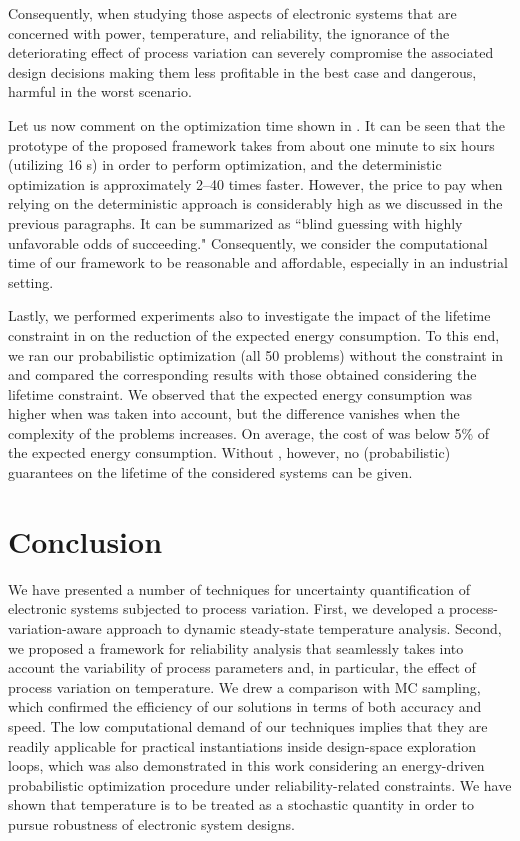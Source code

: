 Consequently, when studying those aspects of electronic systems that are
concerned with power, temperature, and reliability, the ignorance of the
deteriorating effect of process variation can severely compromise the associated
design decisions making them less profitable in the best case and dangerous,
harmful in the worst scenario.

Let us now comment on the optimization time shown in . It can
be seen that the prototype of the proposed framework takes from about one minute
to six hours (utilizing 16 s) in order to perform optimization, and
the deterministic optimization is approximately 2--40 times faster. However, the
price to pay when relying on the deterministic approach is considerably high as
we discussed in the previous paragraphs. It can be summarized as ``blind
guessing with highly unfavorable odds of succeeding." Consequently, we consider
the computational time of our framework to be reasonable and affordable,
especially in an industrial setting.

Lastly, we performed experiments also to investigate the impact of the lifetime
constraint in  on the reduction of the expected
energy consumption. To this end, we ran our probabilistic optimization (all 50
problems) without the constraint in  and compared
the corresponding results with those obtained considering the lifetime
constraint. We observed that the expected energy consumption was higher when
 was taken into account, but the difference
vanishes when the complexity of the problems increases. On average, the cost of
 was below 5\% of the expected energy consumption.
Without , however, no (probabilistic) guarantees on
the lifetime of the considered systems can be given.

\section{Conclusion}

We have presented a number of techniques for uncertainty quantification of
electronic systems subjected to process variation. First, we developed a
process-variation-aware approach to dynamic steady-state temperature analysis.
Second, we proposed a framework for reliability analysis that seamlessly takes
into account the variability of process parameters and, in particular, the
effect of process variation on temperature. We drew a comparison with \ac{MC}
sampling, which confirmed the efficiency of our solutions in terms of both
accuracy and speed. The low computational demand of our techniques implies that
they are readily applicable for practical instantiations inside design-space
exploration loops, which was also demonstrated in this work considering an
energy-driven probabilistic optimization procedure under reliability-related
constraints. We have shown that temperature is to be treated as a stochastic
quantity in order to pursue robustness of electronic system designs.
